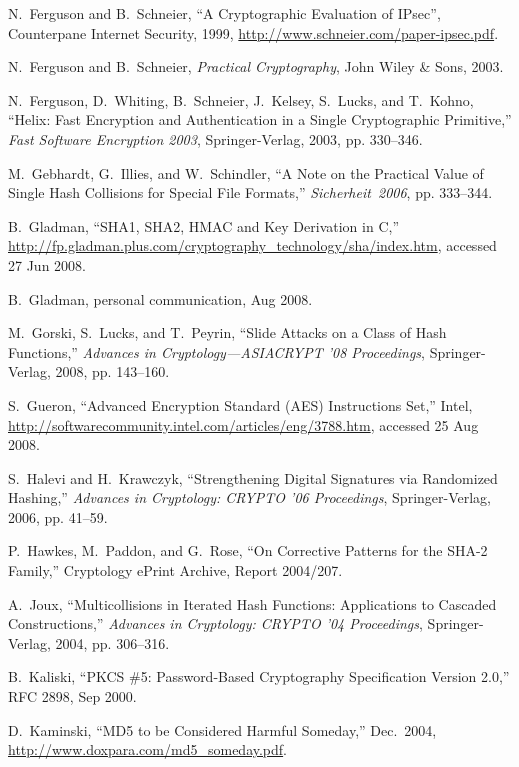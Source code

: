 \documentclass[11pt,twoside]{article}
\newcommand{\purl}{\protect\url}
\begin{document}
{\begin{thebibliography}{19}
 N.~Ferguson and B.~Schneier, ``A Cryptographic Evaluation of IPsec'', Counterpane Internet Security, 1999, \purl{http://www.schneier.com/paper-ipsec.pdf}.

 N.~Ferguson and B.~Schneier, {\it Practical Cryptography}, John Wiley \& Sons, 2003.

 N.~Ferguson, D.~Whiting, B.~Schneier, J.~Kelsey, S.~Lucks, and T.~Kohno, ``Helix: Fast Encryption and Authentication in a Single Cryptographic Primitive,'' {\it Fast Software Encryption 2003}, Springer-Verlag, 2003, pp. 330--346.

 M.~Gebhardt, G.~Illies, and W.~Schindler, ``A Note on the Practical Value of Single Hash Collisions for Special File Formats,'' {\em Sicherheit~2006}, pp. 333--344.

 B.~Gladman, ``SHA1, SHA2, HMAC and Key Derivation in C,'' \purl{http://fp.gladman.plus.com/cryptography_technology/sha/index.htm}, accessed 27 Jun 2008.

 B.~Gladman, personal communication, Aug 2008.

 M.~Gorski, S.~Lucks, and T.~Peyrin, ``Slide Attacks on a Class of Hash Functions,''  {\em Advances in Cryptology---ASIACRYPT '08 Proceedings}, Springer-Verlag, 2008,  pp. 143--160.

 S.~Gueron, ``Advanced Encryption Standard (AES) Instructions Set,'' Intel, \purl{http://softwarecommunity.intel.com/articles/eng/3788.htm}, accessed 25 Aug 2008.

 S.~Halevi and H.~Krawczyk, ``Strengthening Digital Signatures via Randomized Hashing,'' {\it Advances in Cryptology: CRYPTO '06 Proceedings}, Springer-Verlag, 2006, pp. 41--59.

 P.~Hawkes, M.~Paddon, and G.~Rose, ``On Corrective Patterns for the SHA-2 Family,'' Cryptology ePrint Archive, Report 2004/207.

 A.~Joux, ``Multicollisions in Iterated Hash Functions: Applications to Cascaded Constructions,'' {\it Advances in Cryptology: CRYPTO '04 Proceedings}, Springer-Verlag, 2004, pp. 306--316.

 B.~Kaliski, ``PKCS \#5: Password-Based Cryptography Specification Version 2.0,'' RFC 2898, Sep 2000.

  D.~Kaminski, ``MD5 to be Considered Harmful Someday,'' Dec.~2004, \url{http://www.doxpara.com/md5\_someday.pdf}.


\end{thebibliography}}
\end{document}
